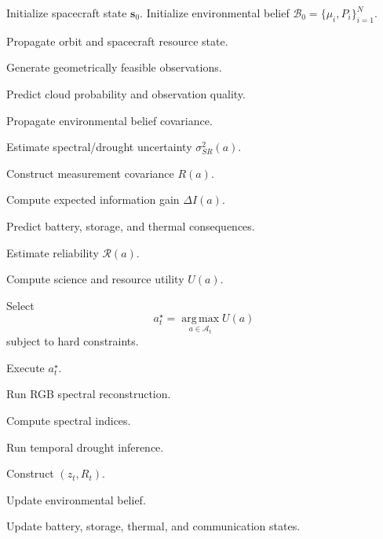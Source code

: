 \documentclass[11pt,a4paper]{article}
\newcommand{\vect}[1]{\bm{#1}}
\newcommand{\argmax}{\operatorname*{arg\,max}}
\begin{document}
\begin{algorithm}[H]
\caption{Proposed AURORA-SR Autonomous Observation Loop}
\label{alg:aurora}
\begin{algorithmic}[1]

\State Initialize spacecraft state $\vect s_0$.
\State Initialize environmental belief
$\mathcal B_0=\{\mu_i,P_i\}_{i=1}^{N}$.


    \State Propagate orbit and spacecraft resource state.

    \State Generate geometrically feasible observations.

    \State Predict cloud probability and observation quality.

    \State Propagate environmental belief covariance.


        \State Estimate spectral/drought uncertainty
        $\sigma^2_{SR}(a)$.

        \State Construct measurement covariance
        $R(a)$.

        \State Compute expected information gain
        $\Delta I(a)$.

        \State Predict battery, storage, and thermal consequences.

        \State Estimate reliability
        $\mathcal R(a)$.

        \State Compute science and resource utility
        $U(a)$.

    \EndFor

    \State Select
    \[
    a_t^\star
    =
    \argmax_{a\in\mathcal A_t}
    U(a)
    \]
    subject to hard constraints.

    \State Execute $a_t^\star$.


        \State Run RGB spectral reconstruction.

        \State Compute spectral indices.

        \State Run temporal drought inference.

        \State Construct $(z_t,R_t)$.

        \State Update environmental belief.

    \EndIf

    \State Update battery, storage, thermal, and communication states.

\EndFor

\end{algorithmic}
\end{algorithm}
\end{document}
